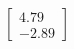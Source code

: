 \documentclass[preview]{standalone}
\begin{document}
\begin{align*}
\begin{bmatrix} 4.79 \\ -2.89 \end{bmatrix}
\end{align*}
\end{document}
